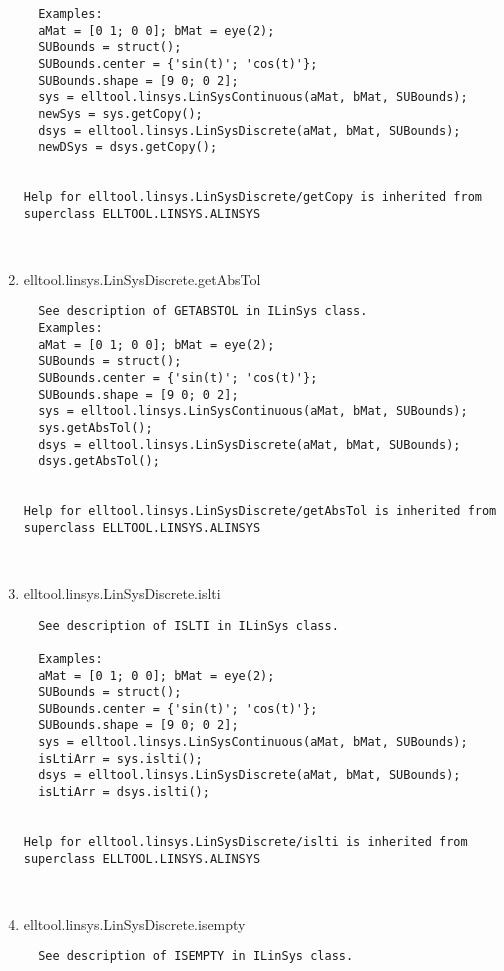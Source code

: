 \begin{enumerate}
\begin{lstlisting}
  Examples:
  aMat = [0 1; 0 0]; bMat = eye(2);
  SUBounds = struct();
  SUBounds.center = {'sin(t)'; 'cos(t)'};
  SUBounds.shape = [9 0; 0 2];
  sys = elltool.linsys.LinSysContinuous(aMat, bMat, SUBounds);
  newSys = sys.getCopy();
  dsys = elltool.linsys.LinSysDiscrete(aMat, bMat, SUBounds);
  newDSys = dsys.getCopy();


Help for elltool.linsys.LinSysDiscrete/getCopy is inherited from superclass ELLTOOL.LINSYS.ALINSYS



\end{lstlisting}
\fontfamily{\familydefault}
\selectfont
\item {elltool.linsys.LinSysDiscrete.getAbsTol}
\selectfont
\begin{lstlisting}
  See description of GETABSTOL in ILinSys class.
  Examples:
  aMat = [0 1; 0 0]; bMat = eye(2);
  SUBounds = struct();
  SUBounds.center = {'sin(t)'; 'cos(t)'};
  SUBounds.shape = [9 0; 0 2];
  sys = elltool.linsys.LinSysContinuous(aMat, bMat, SUBounds);
  sys.getAbsTol();
  dsys = elltool.linsys.LinSysDiscrete(aMat, bMat, SUBounds);
  dsys.getAbsTol();


Help for elltool.linsys.LinSysDiscrete/getAbsTol is inherited from superclass ELLTOOL.LINSYS.ALINSYS



\end{lstlisting}
\fontfamily{\familydefault}
\selectfont
\item {elltool.linsys.LinSysDiscrete.islti}
\selectfont
\begin{lstlisting}
  See description of ISLTI in ILinSys class.

  Examples:
  aMat = [0 1; 0 0]; bMat = eye(2);
  SUBounds = struct();
  SUBounds.center = {'sin(t)'; 'cos(t)'};
  SUBounds.shape = [9 0; 0 2];
  sys = elltool.linsys.LinSysContinuous(aMat, bMat, SUBounds);
  isLtiArr = sys.islti();
  dsys = elltool.linsys.LinSysDiscrete(aMat, bMat, SUBounds);
  isLtiArr = dsys.islti();


Help for elltool.linsys.LinSysDiscrete/islti is inherited from superclass ELLTOOL.LINSYS.ALINSYS



\end{lstlisting}
\fontfamily{\familydefault}
\selectfont
\item {elltool.linsys.LinSysDiscrete.isempty}
\selectfont
\begin{lstlisting}
  See description of ISEMPTY in ILinSys class.


\end{lstlisting}
\end{enumerate}
